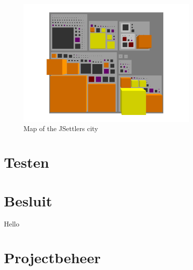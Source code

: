 \documentclass[pdftex12pt, a4paper]{article}
\begin{document}
\begin{figure}
\begin{center}
\includegraphics[width=0.8\textwidth]{Image/Codecity/Codecity3.jpg}
\caption{Map of the JSettlers city}
\label{fig:codecityMap}
\end{center}
\end{figure}

\newpage

\section{Testen}

\newpage

\section{Besluit}

Hello 


\newpage

\section{Projectbeheer}
\end{document}
